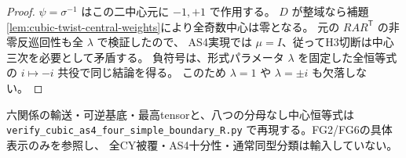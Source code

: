 \begin{proof}
$\psi=\sigma^{-1}$ はこの二中心元に $-1,+1$ で作用する。
$D$ が整域なら補題\ref{lem:cubic-twist-central-weights}により全奇数中心は零となる。
元の $R A R^{\mathsf T}$ の非零反巡回性も全 $\lambda$ で検証したので、
AS4実現では $\mu=I$、従ってH3切断は中心三次を必要として矛盾する。
負符号は、形式パラメータ $\lambda$ を固定した全恒等式の $i\mapsto-i$ 共役で同じ結論を得る。
このため $\lambda=1$ や $\lambda=\pm i$ も欠落しない。
\end{proof}

六関係の輸送・可逆基底・最高tensorと、八つの分母なし中心恒等式は
\texttt{verify\_\allowbreak{}cubic\_\allowbreak{}as4\_\allowbreak{}four\_\allowbreak{}simple\_\allowbreak{}boundary\_\allowbreak{}R.py}
で再現する。FG2/FG6の具体表示のみを参照し、
全CY被覆・AS4十分性・通常同型分類は輸入していない。
